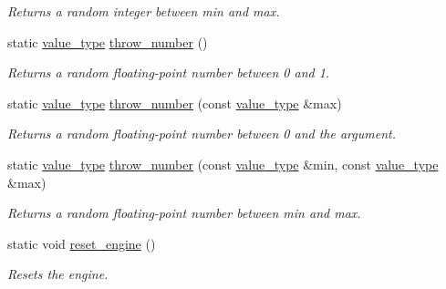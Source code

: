 \begin{DoxyCompactItemize}
\begin{DoxyCompactList}\small\item\em Returns a random integer between min and max. \end{DoxyCompactList}\item 
\hypertarget{a00460_a7146f8145374f9875c1f9b79ac8ba2c1}{static \hyperlink{a00460_a9294408b4bf4d469d2cb1682e10225a8}{value\-\_\-type} \hyperlink{a00460_a7146f8145374f9875c1f9b79ac8ba2c1}{throw\-\_\-number} ()}\label{a00460_a7146f8145374f9875c1f9b79ac8ba2c1}

\begin{DoxyCompactList}\small\item\em Returns a random floating-\/point number between 0 and 1. \end{DoxyCompactList}\item 
\hypertarget{a00460_ad007496e6b3f252263fb5a7471eb5565}{static \hyperlink{a00460_a9294408b4bf4d469d2cb1682e10225a8}{value\-\_\-type} \hyperlink{a00460_ad007496e6b3f252263fb5a7471eb5565}{throw\-\_\-number} (const \hyperlink{a00460_a9294408b4bf4d469d2cb1682e10225a8}{value\-\_\-type} \&max)}\label{a00460_ad007496e6b3f252263fb5a7471eb5565}

\begin{DoxyCompactList}\small\item\em Returns a random floating-\/point number between 0 and the argument. \end{DoxyCompactList}\item 
\hypertarget{a00460_af68d5d4d26c15b15912d4187f0f34ce8}{static \hyperlink{a00460_a9294408b4bf4d469d2cb1682e10225a8}{value\-\_\-type} \hyperlink{a00460_af68d5d4d26c15b15912d4187f0f34ce8}{throw\-\_\-number} (const \hyperlink{a00460_a9294408b4bf4d469d2cb1682e10225a8}{value\-\_\-type} \&min, const \hyperlink{a00460_a9294408b4bf4d469d2cb1682e10225a8}{value\-\_\-type} \&max)}\label{a00460_af68d5d4d26c15b15912d4187f0f34ce8}

\begin{DoxyCompactList}\small\item\em Returns a random floating-\/point number between min and max. \end{DoxyCompactList}\item 
\hypertarget{a00460_a778b7c62cba3d0daa7f84de402829073}{static void \hyperlink{a00460_a778b7c62cba3d0daa7f84de402829073}{reset\-\_\-engine} ()}\label{a00460_a778b7c62cba3d0daa7f84de402829073}

\begin{DoxyCompactList}\small\item\em Resets the engine. \end{DoxyCompactList}\end{DoxyCompactItemize}

